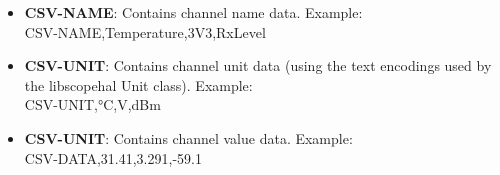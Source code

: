 \begin{itemize}
\item \textbf{CSV-NAME}: Contains channel name data. Example:\\
CSV-NAME,Temperature,3V3,RxLevel

\item \textbf{CSV-UNIT}: Contains channel unit data (using the text encodings used by the libscopehal Unit class). Example:\\
CSV-UNIT,°C,V,dBm

\item \textbf{CSV-UNIT}: Contains channel value data. Example:\\
CSV-DATA,31.41,3.291,-59.1

\end{itemize}
